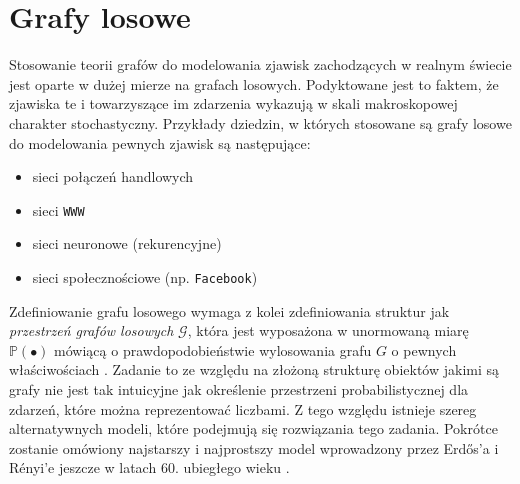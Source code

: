 \documentclass{article}
\begin{document}
\section{Grafy losowe \label{s2}}
	Stosowanie teorii grafów do modelowania zjawisk zachodzących w realnym świecie jest oparte w dużej mierze na grafach losowych. Podyktowane 
	jest to faktem, że zjawiska te i towarzyszące im zdarzenia wykazują w skali makroskopowej charakter stochastyczny. Przykłady dziedzin, w których stosowane
	są grafy losowe do modelowania pewnych zjawisk są następujące:
		\begin{itemize}
			\item 	sieci połączeń handlowych
			\item	sieci \texttt{WWW}
			\item	sieci neuronowe (rekurencyjne)
			\item	sieci społecznościowe (np. \texttt{Facebook})
		\end{itemize}
	Zdefiniowanie grafu losowego wymaga z kolei zdefiniowania struktur jak \textit{przestrzeń grafów losowych} $\mathcal{G}$, która jest
	wyposażona w unormowaną miarę $\mathbb{P}(\bullet)$ mówiącą o prawdopodobieństwie wylosowania grafu $G$ o pewnych właściwościach \cite{Fronczak1}.
	\newline
	Zadanie to ze względu na złożoną strukturę obiektów jakimi są grafy nie jest tak intuicyjne jak określenie przestrzeni probabilistycznej dla
	zdarzeń, które można reprezentować liczbami. Z tego względu istnieje szereg alternatywnych modeli, które podejmują się rozwiązania tego zadania.
	Pokrótce zostanie omówiony najstarszy i najprostszy model wprowadzony przez Erdős'a i Rényi'e jeszcze w latach 60. ubiegłego wieku \cite{Erdos1}. 
\end{document}
